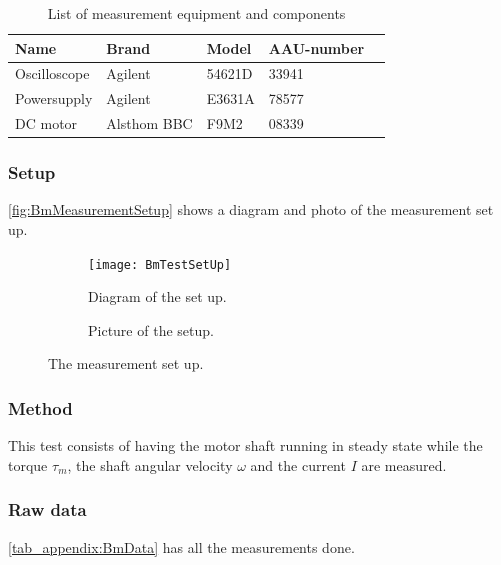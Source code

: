 \begin{table}[htbp]
	\centering
	\caption{List of measurement equipment and components}\label{tab_appendix:BmSetUp}
	
	\begin{tabularx}{\textwidth}{lXXXX}
		Name 				& Brand	& Model & AAU-number									\\ \toprule \rowcolor{lightGrey}
		Oscilloscope	& Agilent & 54621D & 33941 	\\
		Powersupply	& Agilent & E3631A & 78577\\ \rowcolor{lightGrey}
		DC motor & Alsthom BBC & F9M2& 08339
	\end{tabularx}
\end{table}

\subsubsection*{Setup}
\autoref{fig:BmMeasurementSetup} shows a diagram and photo of the measurement set up.
\begin{figure}[htbp]
	\centering
	\begin{subfigure}{0.50\textwidth}
		\texttt{[image: BmTestSetUp]}
		\caption{Diagram of the set up.} \label{fig:BmMeasurementDiagram}
	\end{subfigure}
	\begin{subfigure}{0.40\textwidth}
		\caption{Picture of the setup.} \label{fig:BmMeasurementPictures}
	\end{subfigure}
	\caption{The measurement set up.} \label{fig:BmMeasurementSetup}   
\end{figure}

\subsubsection*{Method}
This test consists of having the motor shaft running in steady state while the torque $\tau_m$, the shaft angular velocity $\omega$ and the current $I$ are measured.

\subsubsection*{Raw data}
\autoref{tab_appendix:BmData} has all the measurements done.

